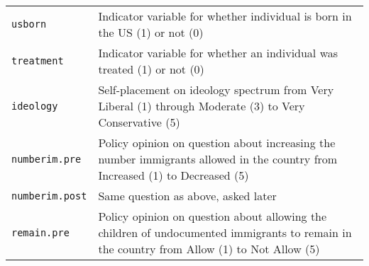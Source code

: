 \documentclass[]{article}
\begin{document}
\begin{longtable}[c]{@{}ll@{}}
\begin{minipage}[t]{0.25\columnwidth}
\texttt{usborn}
\end{minipage} & \begin{minipage}[t]{0.68\columnwidth}\raggedright
Indicator variable for whether individual is born in the US (1) or not
(0)
\end{minipage}
\\\addlinespace
\begin{minipage}[t]{0.25\columnwidth}\raggedright
\texttt{treatment}
\end{minipage} & \begin{minipage}[t]{0.68\columnwidth}\raggedright
Indicator variable for whether an individual was treated (1) or not (0)
\end{minipage}
\\\addlinespace
\begin{minipage}[t]{0.25\columnwidth}\raggedright
\texttt{ideology}
\end{minipage} & \begin{minipage}[t]{0.68\columnwidth}\raggedright
Self-placement on ideology spectrum from Very Liberal (1) through
Moderate (3) to Very Conservative (5)
\end{minipage}
\\\addlinespace
\begin{minipage}[t]{0.25\columnwidth}\raggedright
\texttt{numberim.pre}
\end{minipage} & \begin{minipage}[t]{0.68\columnwidth}\raggedright
Policy opinion on question about increasing the number immigrants
allowed in the country from Increased (1) to Decreased (5)
\end{minipage}
\\\addlinespace
\begin{minipage}[t]{0.25\columnwidth}\raggedright
\texttt{numberim.post}
\end{minipage} & \begin{minipage}[t]{0.68\columnwidth}\raggedright
Same question as above, asked later
\end{minipage}
\\\addlinespace
\begin{minipage}[t]{0.25\columnwidth}\raggedright
\texttt{remain.pre}
\end{minipage} & \begin{minipage}[t]{0.68\columnwidth}\raggedright
Policy opinion on question about allowing the children of undocumented
immigrants to remain in the country from Allow (1) to Not Allow (5)
\end{minipage}

\end{longtable}
\end{document}
